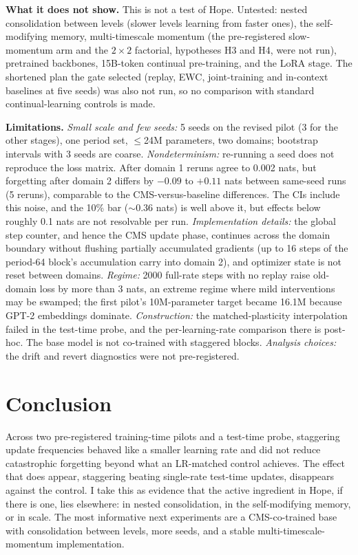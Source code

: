 \documentclass[10pt]{article}
\begin{document}
\textbf{What it does not show.} This is not a test of Hope. Untested: nested consolidation between levels (slower levels learning from faster ones),
the self-modifying memory, multi-timescale momentum (the pre-registered slow-momentum arm and the $2\times2$ factorial, hypotheses H3 and H4, were not run), pretrained backbones,
15B-token continual pre-training, and the LoRA stage. The shortened plan the gate selected (replay, EWC, joint-training and in-context baselines at five seeds) was also not run, so no comparison with
standard continual-learning controls is made.

\textbf{Limitations.}
\emph{Small scale and few seeds:} 5 seeds on the revised pilot (3 for the other stages), one period set, $\leq$24M parameters, two domains; bootstrap intervals with 3 seeds are coarse.
\emph{Nondeterminism:} re-running a seed does not reproduce the loss matrix. After domain 1 reruns agree to 0.002 nats, but forgetting after domain 2 differs by $-0.09$ to $+0.11$ nats
between same-seed runs (5 reruns), comparable to the CMS-versus-baseline differences. The CIs include this noise, and the 10\% bar ($\sim$0.36 nats) is well above it, but effects below roughly 0.1 nats are not resolvable per run.
\emph{Implementation details:} the global step counter, and hence the CMS update phase, continues across the domain boundary without flushing partially accumulated gradients (up to 16 steps of the period-64 block's accumulation carry into domain 2),
and optimizer state is not reset between domains. \emph{Regime:} 2000 full-rate steps with no replay raise old-domain loss by more than 3 nats, an extreme regime where mild interventions may be swamped; the first pilot's 10M-parameter target became 16.1M because GPT-2 embeddings dominate.
\emph{Construction:} the matched-plasticity interpolation failed in the test-time probe, and the per-learning-rate comparison there is post-hoc. The base model is not co-trained with staggered blocks.
\emph{Analysis choices:} the drift and revert diagnostics were not pre-registered.

\section{Conclusion}
Across two pre-registered training-time pilots and a test-time probe, staggering update frequencies behaved like a smaller learning rate and did not reduce
catastrophic forgetting beyond what an LR-matched control achieves. The effect that does appear, staggering beating single-rate test-time updates, disappears against the control. I take this as evidence that the
active ingredient in Hope, if there is one, lies elsewhere: in nested consolidation, in the self-modifying memory, or in scale. The most informative next experiments are a CMS-co-trained base with consolidation between levels,
more seeds, and a stable multi-timescale-momentum implementation.
\end{document}
